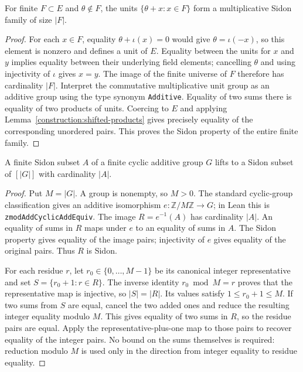 \begin{lemma}
\label{construction:unit-family}
\leanok
For finite $F\subset E$ and $\theta\notin F$, the units
$\{\theta+x:x\in F\}$ form a multiplicative Sidon family of size $|F|$.
\end{lemma}
\begin{proof}
For each $x\in F$, equality $\theta+\iota(x)=0$ would give
$\theta=\iota(-x)$, so this element is nonzero and defines a unit of $E$.
Equality between the units for $x$ and $y$ implies equality between their
underlying field elements; cancelling $\theta$ and using injectivity of
$\iota$ gives $x=y$.  The image of the finite universe of $F$ therefore
has cardinality $|F|$.
Interpret the commutative multiplicative unit group as an additive group
using the type synonym \texttt{Additive}.  Equality of two sums there is
equality of two products of units.  Coercing to $E$ and applying
Lemma~\ref{construction:shifted-products} gives precisely equality of
the corresponding unordered pairs.  This proves the Sidon property of
the entire finite family.
\end{proof}

\begin{lemma}
\label{construction:cyclic-lift}
\leanok
A finite Sidon subset $A$ of a finite cyclic additive group $G$ lifts to a
Sidon subset of $[|G|]$ with cardinality $|A|$.
\end{lemma}
\begin{proof}
Put $M=|G|$.  A group is nonempty, so $M>0$.
The standard cyclic-group classification gives an additive isomorphism
$e:\mathbb Z/M\mathbb Z\to G$; in Lean this is
\texttt{zmodAddCyclicAddEquiv}.
The image $R=e^{-1}(A)$ has cardinality $|A|$.
An equality of sums in $R$ maps under $e$ to an equality of sums in $A$.
The Sidon property gives equality of the image pairs; injectivity of $e$
gives equality of the original pairs.  Thus $R$ is Sidon.

For each residue $r$, let $r_0\in\{0,\ldots,M-1\}$ be its canonical
integer representative and set
$S=\{r_0+1:r\in R\}$.  The inverse identity
$r_0\bmod M=r$ proves that the representative map is injective, so
$|S|=|R|$.  Its values satisfy $1\le r_0+1\le M$.
If two sums from $S$ are equal, cancel the two added ones and reduce the
resulting integer equality modulo $M$.  This gives equality of two sums
in $R$, so the residue pairs are equal.  Apply the representative-plus-one
map to those pairs to recover equality of the integer pairs.
No bound on the sums themselves is required: reduction modulo $M$ is used
only in the direction from integer equality to residue equality.
\end{proof}

